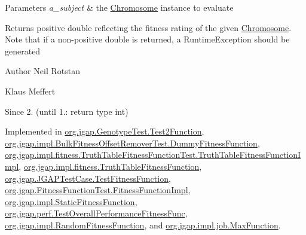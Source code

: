 \begin{DoxyParams}{Parameters}
{\em a\-\_\-subject} & the \hyperlink{classorg_1_1jgap_1_1_chromosome}{Chromosome} instance to evaluate\\
\hline
\end{DoxyParams}
\begin{DoxyReturn}{Returns}
positive double reflecting the fitness rating of the given \hyperlink{classorg_1_1jgap_1_1_chromosome}{Chromosome}. Note that if a non-\/positive double is returned, a Runtime\-Exception should be generated
\end{DoxyReturn}
\begin{DoxyAuthor}{Author}
Neil Rotstan 

Klaus Meffert 
\end{DoxyAuthor}
\begin{DoxySince}{Since}
2. (until 1.\-: return type int) 
\end{DoxySince}


Implemented in \hyperlink{classorg_1_1jgap_1_1_genotype_test_1_1_test2_function_ac741afc698abf042df1f9944c4de9b64}{org.\-jgap.\-Genotype\-Test.\-Test2\-Function}, \hyperlink{classorg_1_1jgap_1_1impl_1_1_bulk_fitness_offset_remover_test_1_1_dummy_fitness_function_a2747fc89c0b198c7ed5123d9f7257163}{org.\-jgap.\-impl.\-Bulk\-Fitness\-Offset\-Remover\-Test.\-Dummy\-Fitness\-Function}, \hyperlink{classorg_1_1jgap_1_1impl_1_1fitness_1_1_truth_table_fitness_function_test_1_1_truth_table_fitness_function_impl_ada3bae7de32db125a917447b1680482f}{org.\-jgap.\-impl.\-fitness.\-Truth\-Table\-Fitness\-Function\-Test.\-Truth\-Table\-Fitness\-Function\-Impl}, \hyperlink{classorg_1_1jgap_1_1impl_1_1fitness_1_1_truth_table_fitness_function_a3f159f68ac2f247c18d1e62ff030c56c}{org.\-jgap.\-impl.\-fitness.\-Truth\-Table\-Fitness\-Function}, \hyperlink{classorg_1_1jgap_1_1_j_g_a_p_test_case_1_1_test_fitness_function_a394849df24473b2a23c394f46024e817}{org.\-jgap.\-J\-G\-A\-P\-Test\-Case.\-Test\-Fitness\-Function}, \hyperlink{classorg_1_1jgap_1_1_fitness_function_test_1_1_fitness_function_impl_a03ea7e09f08e84fbdf1b40ad53242516}{org.\-jgap.\-Fitness\-Function\-Test.\-Fitness\-Function\-Impl}, \hyperlink{classorg_1_1jgap_1_1impl_1_1_static_fitness_function_a0be7d9763e3cd063933c2ac39c742b41}{org.\-jgap.\-impl.\-Static\-Fitness\-Function}, \hyperlink{classorg_1_1jgap_1_1perf_1_1_test_overall_performance_fitness_func_ad03ee237768a581313bb05c1a7fdf481}{org.\-jgap.\-perf.\-Test\-Overall\-Performance\-Fitness\-Func}, \hyperlink{classorg_1_1jgap_1_1impl_1_1_random_fitness_function_a946f5cf586ad067f029a4ab65f45f1f0}{org.\-jgap.\-impl.\-Random\-Fitness\-Function}, and \hyperlink{classorg_1_1jgap_1_1impl_1_1job_1_1_max_function_a6b0344c8642af9170743d9be9a6509b8}{org.\-jgap.\-impl.\-job.\-Max\-Function}.



